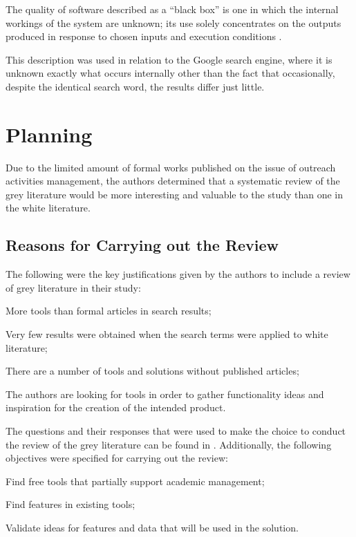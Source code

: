 The quality of software described as a ``black box'' is one in which the internal workings of the system are unknown; its use solely concentrates on the outputs produced in response to chosen inputs and execution conditions \textcite{nidhra2012black}.

This description was used in relation to the Google search engine, where it is unknown exactly what occurs internally other than the fact that occasionally, despite the identical search word, the results differ just little.

\section{Planning}\label{sec:gl-planning}

Due to the limited amount of formal works published on the issue of outreach activities management, the authors determined that a systematic review of the grey literature would be more interesting and valuable to the study than one in the white literature.

\subsection{Reasons for Carrying out the Review}\label{sec:gl-planning-motives}

The following were the key justifications given by the authors to include a review of grey literature in their study:
\begin{inparaenum}[(i)]
    \item More tools than formal articles in search results;
    \item Very few results were obtained when the search terms were applied to white literature;
  \item There are a number of tools and solutions without published articles;
  \item The authors are looking for tools in order to gather functionality ideas and inspiration for the creation of the intended product.
\end{inparaenum}

The questions and their responses that were used to make the choice to conduct the review of the grey literature can be found in . Additionally, the following objectives were specified for carrying out the review:

\begin{inparaenum}[(i)]
  \item Find free tools that partially support academic management;
  \item Find features in existing tools;
  \item Validate ideas for features and data that will be used in the solution.
\end{inparaenum}

